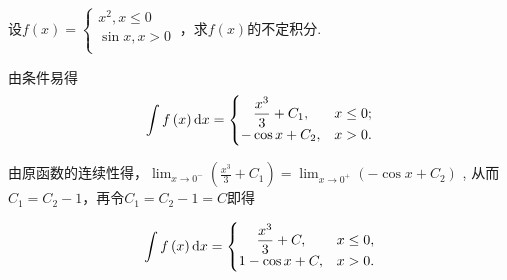\begin{problem} 设$f\left( x \right) = \left\{ \begin{matrix}
x^{2}, x \leq 0 \\
\sin x,x > 0 \\
\end{matrix} \right.\ $，求$f\left( x \right)$的不定积分.

\begin{solution} 
	由条件易得
	$$\int{f\left( x \right){\mathop{}\!\mathrm{d}x}} = \left\{ \begin{matrix}
\dfrac{x^{3}}{3} + C_{1},& x \leq 0; \\
-\cos x + C_{2}, &x > 0. \\
\end{matrix} \right. $$

由原函数的连续性得，$\displaystyle \lim_{x \rightarrow 0^{-}}\left( \frac{x^{3}}{3} + C_{1} \right) = \lim_{x \rightarrow 0^{+}}\left( - \cos x + C_{2} \right)$
, 从而
$C_{1} = C_{2} - 1$，再令$C_{1} = C_{2} - 1 = C$即得

$$\int{f\left( x \right)\d x} = \left\{ \begin{matrix}
\dfrac{x^{3}}{3} + C, &x \leq 0, \\
1 - \cos x + C, &x > 0. \\
\end{matrix} \right.$$

\end{solution}   
\end{problem}

